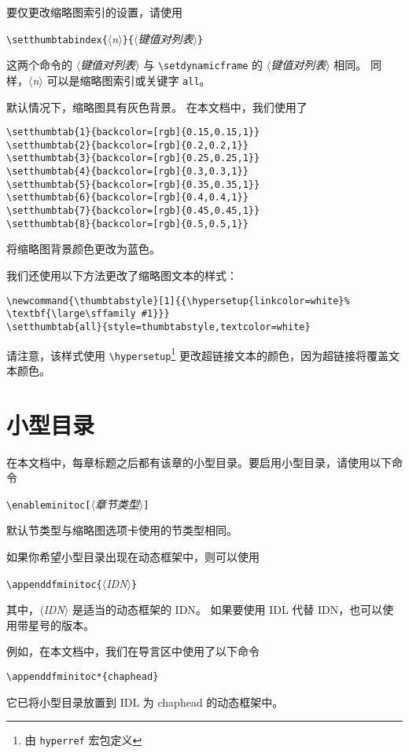 \documentclass[a4paper]{book}%
\newcommand{\thumbtabstyle}[1]{\LARGE\sffamily\textbf{#1}}
\newcommand{\sty}[1]{\texttt{#1}}
\newcommand{\meta}[1]{\textnormal{\ensuremath{\langle}\makebox[0pt][l]{}\emph{#1}\makebox[0pt][l]{}\ensuremath{\rangle}}}
\newcommand{\cmd}[1]{\texttt{#1}}
\begin{document}
要仅更改缩略图索引的设置，请使用
\begin{mdframed}
    \verb|\setthumbtabindex{|\meta{n}\verb|}{|\meta{键值对列表}\verb|}|
\end{mdframed}
这两个命令的 \meta{键值对列表} 与 \verb|\setdynamicframe| 的 \meta{键值对列表} 相同。 同样，\meta{n} 可以是缩略图索引或关键字 \cmd{all}。

默认情况下，缩略图具有灰色背景。 在本文档中，我们使用了
\begin{lstlisting}[backgroundcolor=\color{white}]
\setthumbtab{1}{backcolor=[rgb]{0.15,0.15,1}}
\setthumbtab{2}{backcolor=[rgb]{0.2,0.2,1}}
\setthumbtab{3}{backcolor=[rgb]{0.25,0.25,1}}
\setthumbtab{4}{backcolor=[rgb]{0.3,0.3,1}}
\setthumbtab{5}{backcolor=[rgb]{0.35,0.35,1}}
\setthumbtab{6}{backcolor=[rgb]{0.4,0.4,1}}
\setthumbtab{7}{backcolor=[rgb]{0.45,0.45,1}}
\setthumbtab{8}{backcolor=[rgb]{0.5,0.5,1}}
\end{lstlisting}
将缩略图背景颜色更改为蓝色。

我们还使用以下方法更改了缩略图文本的样式：
\begin{lstlisting}[backgroundcolor=\color{white}]
\newcommand{\thumbtabstyle}[1]{{\hypersetup{linkcolor=white}%
\textbf{\large\sffamily #1}}}
\setthumbtab{all}{style=thumbtabstyle,textcolor=white}
\end{lstlisting}
请注意，该样式使用 \verb|\hypersetup|\footnote{由 \sty{hyperref} 宏包定义} 更改超链接文本的颜色，因为超链接将覆盖文本颜色。
\section{小型目录}%
在本文档中，每章标题之后都有该章的小型目录。要启用小型目录，请使用以下命令
\begin{mdframed}
    \verb|\enableminitoc[|\meta{章节类型}\verb|]|
\end{mdframed}
默认节类型与缩略图选项卡使用的节类型相同。

如果你希望小型目录出现在动态框架中，则可以使用
\begin{mdframed}
    \verb|\appenddfminitoc{|\meta{IDN}\verb|}|
\end{mdframed}
其中，\meta{IDN} 是适当的动态框架的 IDN。 如果要使用 IDL 代替 IDN，也可以使用带星号的版本。

例如，在本文档中，我们在导言区中使用了以下命令
\begin{mdframed}
    \verb|\appenddfminitoc*{chaphead}|
\end{mdframed}
它已将小型目录放置到 IDL 为 chaphead 的动态框架中。
\end{document}
